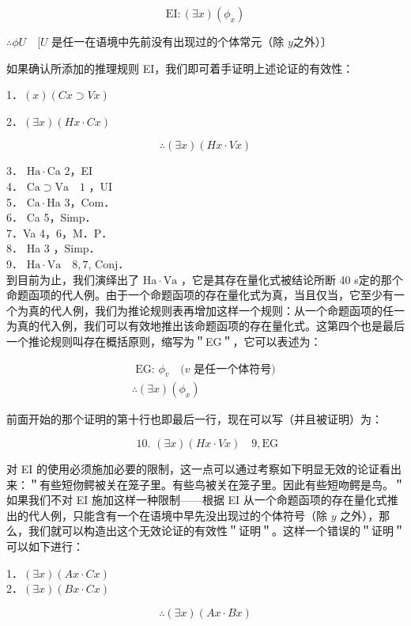 $$
\mathrm{EI}:(\exists x)\left(\phi_{x}\right)
$$

$\therefore \phi U \quad[U$ 是任一在语境中先前没有出现过的个体常元（除 $y$之外）〕

如果确认所添加的推理规则 EI，我们即可着手证明上述论证的有效性：

1．$(x)(C x \supset V x)$

2．$(\exists x)(H x \cdot C x)$

$$
\therefore(\exists x)(H x \cdot V x)
$$

3． $\mathrm{Ha} \cdot \mathrm{Ca}$ 2，EI\\
4． $\mathrm{Ca} \supset \mathrm{Va} \quad 1$ ，UI\\
5． $\mathrm{Ca} \cdot \mathrm{Ha}$ 3，Com．\\
6． Ca 5，Simp．\\
7．Va 4，6，M．P．\\
8． Ha 3 ，Simp．\\
9． $\mathrm{Ha \cdot Va} \quad 8,7$, Conj．\\
到目前为止，我们演绎出了 $\mathrm{Ha} \cdot \mathrm{Va}$ ，它是其存在量化式被结论所断 40 s定的那个命题函项的代人例。由于一个命题函项的存在量化式为真，当且仅当，它至少有一个为真的代人例，我们为推论规则表再增加这样一个规则：从一个命题函项的任一为真的代入例，我们可以有效地推出该命题函项的存在量化式。这第四个也是最后一个推论规则叫存在概括原则，缩写为＂EG＂，它可以表述为：

$$
\begin{gathered}
\text { EG: } \phi_{v} \quad(v \text { 是任一个体符号) } \\
\therefore(\exists x)\left(\phi_{x}\right)
\end{gathered}
$$

前面开始的那个证明的第十行也即最后一行，现在可以写（并且被证明）为：

$$
\text { 10. }(\exists x)(H x \cdot V x) \quad 9, \mathrm{EG}
$$

对 EI 的使用必须施加必要的限制，这一点可以通过考察如下明显无效的论证看出来：＂有些短伆鳄被关在笼子里。有些鸟被关在笼子里。因此有些短吻鳄是鸟。＂如果我们不对 EI 施加这样一种限制——根据 EI 从一个命题函项的存在量化式推出的代人例，只能含有一个在语境中早先没出现过的个体符号（除 $y$ 之外），那么，我们就可以构造出这个无效论证的有效性＂证明＂。这样一个错误的＂证明＂可以如下进行：

1．$(\exists x)(A x \cdot C x)$\\
2．$(\exists x)(B x \cdot C x)$

$$
\therefore(\exists x)(A x \cdot B x)
$$

